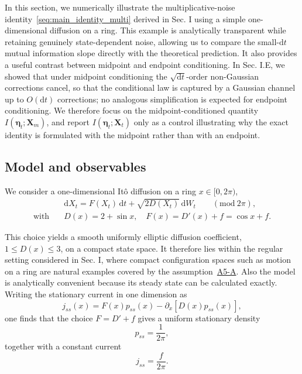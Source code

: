 In this section, we numerically illustrate the multiplicative-noise identity~\eqref{seq:main_identity_multi} derived in Sec. I using a simple one-dimensional diffusion on a ring. This example is analytically transparent while retaining genuinely state-dependent noise, allowing us to compare the small-$\mathrm dt$ mutual information slope directly with the theoretical prediction. It also provides a useful contrast between midpoint and endpoint conditioning. In Sec. I.E, we showed that under midpoint conditioning the $\sqrt{\mathrm dt}$-order non-Gaussian corrections cancel, so that the conditional law is captured by a Gaussian channel up to $O(\mathrm dt)$ corrections; no analogous simplification is expected for endpoint conditioning. We therefore focus on the midpoint-conditioned quantity $I(\bm\eta_t;\bm X_m)$, and report $I(\bm\eta_t;\bm X_t)$ only as a control illustrating why the exact identity is formulated with the midpoint rather than with an endpoint. 

\vspace*{-0.6\baselineskip}
\subsection{Model and observables}
\vspace*{-0.6\baselineskip}

We consider a one-dimensional It\^{o} diffusion on a ring $x\in[0,2\pi)$,
\begin{equation}
\begin{aligned}
    &\mathrm d X_t
    =F(X_t)\,\mathrm dt
    +\sqrt{2D(X_t)}\,\mathrm dW_t
    \qquad(\mathrm{mod}\ 2\pi),
    \\
    \text{with}\quad&
    D(x)=2+\sin x,
    \quad F(x)=D'(x)+f=\cos x+f.
\end{aligned}
\label{seq:1D_ring_model}
\end{equation}

This choice yields a smooth uniformly elliptic diffusion coefficient, $1\leq D(x)\leq3$, on a compact state space. It therefore lies within the regular setting considered in Sec. I, where compact configuration spaces such as motion on a ring are natural examples covered by the assumption~\hyperlink{assumption:A5-A}{A5-A}. Also the model is analytically convenient because its steady state can be calculated exactly. Writing the stationary current in one dimension as
\[
    j_{ss}(x)=F(x)p_{ss}(x)-\partial_x[D(x)p_{ss}(x)],
\]
one finds that the choice $F=D'+f$ gives a uniform stationary density
\[
    p_{ss}=\frac{1}{2\pi},
\]
together with a constant current
\[
j_{ss}=\frac{f}{2\pi}.
\]

